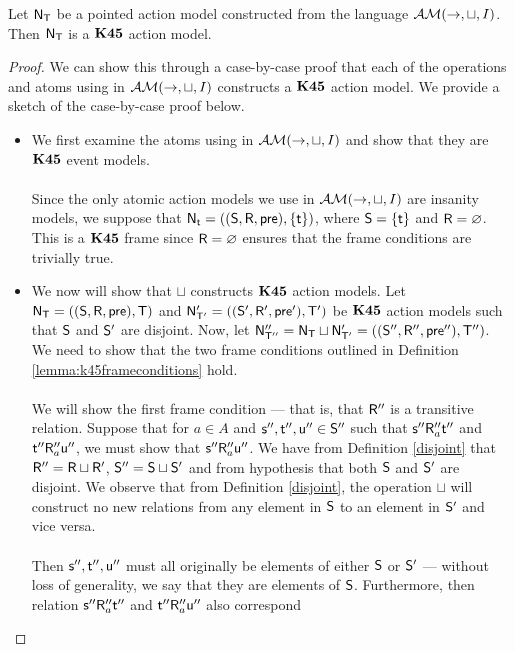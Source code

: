 \begin{lemma} \label{lemma:onlyK45Models}
	Let $\evM_\evT$ be a pointed action model constructed from the language $\EM(\to,\sqcup,I)$.
	Then $\evM_\evT$ is a $\AXKFF$ action model.
\end{lemma}
\begin{proof}
	We can show this through a case-by-case proof that each of the operations and atoms using in
	$\EM(\to,\sqcup,I)$ constructs a $\AXKFF$ action model.
	We provide a sketch of the case-by-case proof below.
	\begin{itemize}
		\item We first examine the atoms using in $\EM(\to,\sqcup,I)$ and show that they are $\AXKFF$ event
	models.\\
	\\
	Since the only atomic action models we use in $\EM(\to,\sqcup,I)$ are insanity models, we suppose
	that $\evM_{\evt} = ((\evS,\evR,\evpr),\{\evt\})$, where $\evS = \{\evt\}$ and $\evR =
	\varnothing$.
	This is a $\AXKFF$ frame since $\evR = \varnothing$ ensures that the frame conditions
	are trivially true.
		\item We now will show that $\sqcup$ constructs $\AXKFF$ action models.
	Let $\evM_\evT = ((\evS,\evR,\evpr),\evT)$ and $\evM'_{\evT'} = ((\evS',\evR',\evpr'),\evT')$ be
	$\AXKFF$ action models such that $\evS$ and $\evS'$ are disjoint.
	Now, let $\evM''_{\evT''} = \evM_\evT \sqcup \evM'_{\evT'} = ((\evS'',\evR'',\evpr''),\evT'')$.
	We need to show that the two frame conditions outlined in Definition \ref{lemma:k45frameconditions}
	hold.\\
	\\
	We will show the first frame condition --- that is, that $\evR''$ is a transitive relation.
	Suppose that for $a \in A$ and $\evs'', \evt'', \evu'' \in \evS''$ such that $\evs'' \evR''_a
	\evt''$ and $\evt'' \evR''_a \evu''$, we must show that $\evs'' \evR''_a \evu''$.
	We have from Definition \ref{disjoint} that $\evR'' = \evR \sqcup \evR'$, $\evS'' = \evS \sqcup
	\evS'$ and from hypothesis that both $\evS$ and $\evS'$ are disjoint.
	We observe that from Definition \ref{disjoint}, the operation $\sqcup$ will construct no new
	relations from any element in $\evS$ to an element in $\evS'$ and vice versa.\\
	\\
	Then $\evs'', \evt'', \evu''$ must all originally be elements of either $\evS$ or $\evS'$ ---
	without loss of generality, we say that they are elements of $\evS$.
	Furthermore, then relation $\evs'' \evR''_a \evt''$ and $\evt'' \evR''_a \evu''$ also correspond

\end{itemize}
\end{proof}
